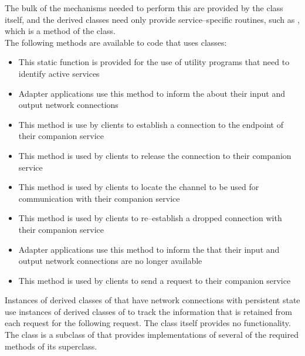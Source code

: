 The bulk of the mechanisms needed to perform this are provided by the
 class itself, and the derived classes need only
provide service--specific routines, such as ,
which is a method of the  class.\\

The following methods are available to code that uses
 classes:
\begin{itemize}
\item \textbf{} This static function is provided for the use
of utility programs that need to identify active services
\item \textbf{} Adapter applications use this method to
inform the  about their input and output
\yarp{} network connections
\item \textbf{} This method is use by clients to establish a
connection to the endpoint of their companion service
\item \textbf{} This method is used by clients to release
the connection to their companion service
\item \textbf{} This method is used by clients to locate the channel
to be used for communication with their companion service
\item \textbf{} This method is used by clients to
re--establish a dropped connection with their companion service
\item \textbf{} Adapter applications use this method to
inform the  that their input and output
\yarp{} network connections are no longer available
\item \textbf{} This method is used by clients to send a request to their
companion service
\end{itemize}
Instances of derived classes of  that have \yarp{}
network connections with persistent state use instances of
derived classes of  to track
the information that is retained from each request for the following request.
The  class itself provides no functionality.
\secondaryEnd{}
The 
class is a subclass of 
that provides implementations of several of the required methods of its superclass.\\

